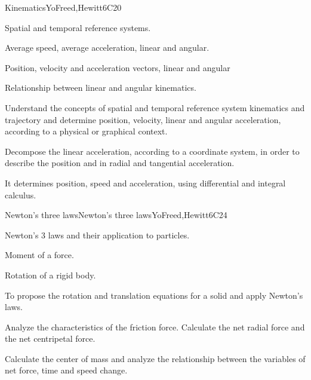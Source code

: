 \begin{syllabus}
\begin{unit}{}{Kinematics}{YoFreed,Hewitt}{6}{C20}
   \begin{topics}
      \item Spatial and temporal reference systems.
      \item Average speed, average acceleration, linear and angular.
      \item Position, velocity and acceleration vectors, linear and angular
      \item Relationship between linear and angular kinematics.
      \end{topics}
   \begin{learningoutcomes}
      \item Understand the concepts of spatial and temporal reference system kinematics and trajectory and determine position, velocity, linear and angular acceleration, according to a physical or graphical context.
      \item Decompose the linear acceleration, according to a coordinate system, in order to describe the position and in radial and tangential acceleration.
      \item It determines position, speed and acceleration, using differential and integral calculus. 
   \end{learningoutcomes}
\end{unit}
   
\begin{unit}{Newton's three laws}{Newton's three laws}{YoFreed,Hewitt}{6}{C24}
   \begin{topics}
      \item Newton's 3 laws and their application to particles.
      \item Moment of a force.
      \item Rotation of a rigid body.
   \end{topics}

   \begin{learningoutcomes}
      \item To propose the rotation and translation equations for a solid and apply Newton's laws. 
      \item Analyze the characteristics of the friction force. Calculate the net radial force and the net centripetal force.
      \item Calculate the center of mass and analyze the relationship between the variables of net force, time and speed change. 
   \end{learningoutcomes}
\end{unit}

\begin{coursebibliography}
\end{coursebibliography}

\end{syllabus}
